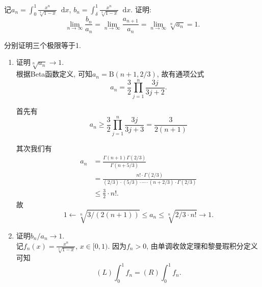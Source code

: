 \documentclass[a4paper,12pt]{ctexart}
\title{\TITLE}
\author{\AUTHOR}
\date{\today}
\newcommand*\diff{\mathop{}\!\mathrm{d}}
\newcommand*\Beta{\mathrm{B}}
\begin{document}
    \maketitle
    \thispagestyle{empty}
    \newpage

    \pagestyle{fancy}
    \linenumbers
    
    \begin{problem}
        记$\displaystyle a_n=\int_{0}^{1}{\frac{x^n}{\sqrt[3]{1-x}}\diff x}$,
        $\displaystyle b_n=\int_{\delta}^{1}{\frac{x^n}{\sqrt[3]{1-x}}\diff x}$.
        证明:
        \[\lim_{n\to \infty}{\frac{b_n}{a_n}}=
        \lim_{n\to \infty}{\frac{a_{n+1}}{a_n}}=
        \lim_{n\to \infty}{\sqrt[n]{a_n}}=1.\]
    \end{problem}

    \begin{solution}
        分别证明三个极限等于1.
        
        \begin{enumerate}[Step i.]
        \item 证明$\sqrt[n]{a_n}\to 1$.\\
            根据Beta函数定义, 可知$a_n=\Beta(n+1, 2/3)$, 故有通项公式
            \begin{equation}
                a_n = \frac{3}{2}\prod_{j=1}^{n}{\frac{3j}{3j+2}}.
            \end{equation}

            首先有
            \begin{equation}
                \label{angeq}
                a_n 
                \geq \frac{3}{2}\prod_{j=1}^{n}{\frac{3j}{3j+3}}
                = \frac{3}{2(n+1)}
            \end{equation}

            其次我们有
            \begin{equation}
            \begin{aligned}
                a_n &= \frac{\Gamma(n+1)\Gamma(2/3)}{\Gamma(n+5/3)}\\
                &= \frac{n!\cdot\Gamma(2/3)}{(2/3)\cdot(5/3)\cdot\dotsm
                    \cdot(n+2/3)\cdot\Gamma(2/3)}\\
                &\leq \frac{3}{2}\cdot n!.
            \end{aligned}
            \end{equation}
            故
            \begin{equation}
                1\leftarrow \sqrt[n]{3/(2(n+1))} \leq a_n \leq \sqrt[n]{2/3\cdot n!} \to 1.
            \end{equation}
        \item 证明$b_n/a_n\to 1.$\\
            记$\displaystyle f_n(x)=\frac{x^n}{\sqrt[3]{1-x}}$, $x\in [0, 1)$.
            因为$f_n>0$, 由单调收敛定理和黎曼瑕积分定义可知
            \begin{equation}
                (L)\int_{0}^{1}f_n = (R)\int_{0}^{1}f_n.
            \end{equation}
            

\end{enumerate}
\end{solution}
\end{document}
